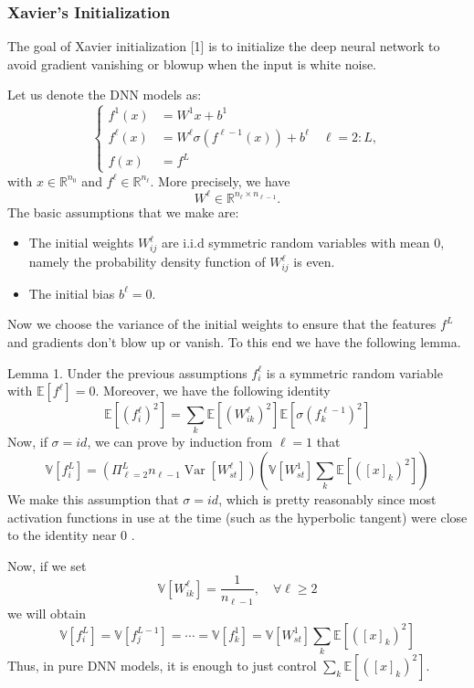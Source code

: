 \documentclass[10pt]{article}
\begin{document}
\subsubsection{Xavier's Initialization}
The goal of Xavier initialization [1] is to initialize the deep neural network to avoid gradient vanishing or blowup when the input is white noise.

Let us denote the DNN models as:
$$
\begin{cases}f^{1}(x) & =W^{1} x+b^{1} \\ f^{\ell}(x) & =W^{\ell} \sigma\left(f^{\ell-1}(x)\right)+b^{\ell} \quad \ell=2: L, \\ f(x) & =f^{L}\end{cases}
$$
with $x \in \mathbb{R}^{n_{0}}$ and $f^{\ell} \in \mathbb{R}^{n_{\ell}}$. More precisely, we have
$$
W^{\ell} \in \mathbb{R}^{n_{\ell} \times n_{\ell-1}} .
$$
The basic assumptions that we make are:

    \begin{itemize}
      \item The initial weights $W_{i j}^{\ell}$ are i.i.d symmetric random variables with mean 0, namely the probability density function of $W_{i j}^{\ell}$ is even.

      \item The initial bias $b^{\ell}=0$.

    \end{itemize}
Now we choose the variance of the initial weights to ensure that the features $f^{L}$ and gradients don't blow up or vanish. To this end we have the following lemma.

Lemma 1. Under the previous assumptions $f_{i}^{\ell}$ is a symmetric random variable with $\mathbb{E}\left[f^{\ell}\right]=0 .$ Moreover, we have the following identity
$$
\mathbb{E}\left[\left(f_{i}^{\ell}\right)^{2}\right]=\sum_{k} \mathbb{E}\left[\left(W_{i k}^{\ell}\right)^{2}\right] \mathbb{E}\left[\sigma\left(f_{k}^{\ell-1}\right)^{2}\right]
$$
Now, if $\sigma=i d$, we can prove by induction from $\ell=1$ that
$$
\mathbb{V}\left[f_{i}^{L}\right]=\left(\Pi_{\ell=2}^{L} n_{\ell-1} \operatorname{Var}\left[W_{s t}^{\ell}\right]\right)\left(\mathbb{V}\left[W_{s t}^{1}\right] \sum_{k} \mathbb{E}\left[\left([x]_{k}\right)^{2}\right]\right)
$$
We make this assumption that $\sigma=i d$, which is pretty reasonably since most activation functions in use at the time (such as the hyperbolic tangent) were close to the identity near 0 .

Now, if we set
$$
\mathbb{V}\left[W_{i k}^{\ell}\right]=\frac{1}{n_{\ell-1}}, \quad \forall \ell \geq 2
$$
we will obtain
$$
\mathbb{V}\left[f_{i}^{L}\right]=\mathbb{V}\left[f_{j}^{L-1}\right]=\cdots=\mathbb{V}\left[f_{k}^{1}\right]=\mathbb{V}\left[W_{s t}^{1}\right] \sum_{k} \mathbb{E}\left[\left([x]_{k}\right)^{2}\right]
$$
Thus, in pure DNN models, it is enough to just control $\sum_{k} \mathbb{E}\left[\left([x]_{k}\right)^{2}\right] .$
\end{document}
